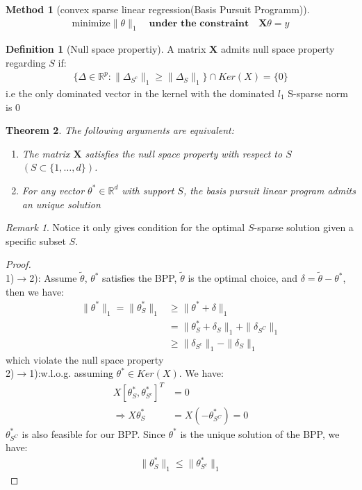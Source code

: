 \documentclass[a4paper,12pt, oneside, fleqn]{book}
\newtheorem{theorem}{Theorem}[section]
\newtheorem{method}[theorem]{Method}
\theoremstyle{definition}
\newtheorem{definition}{Definition}[section]
\theoremstyle{remark}
\newtheorem*{remark}{Remark}
\begin{document}
\begin{method}[convex sparse linear regression(Basis Pursuit Programm)]
\begin{align}\label{bpp}
	\text{minimize} \|\theta\|_1 \quad \textbf{under the constraint}\quad \mathbf{X} \theta = y
\end{align}
\end{method}


\begin{definition}[Null space propertiy]
	A matrix $\mathbf{X}$ admits null space property regarding $S$ if:
	\begin{align*}
		\{ \Delta \in \mathbb{R}^p: \|\Delta_{S^c}\|_1 \geq \|\Delta_S\|_1 \} \cap Ker(X) = \{0\}
	\end{align*}
	i.e the only dominated vector in the kernel with the dominated $l_1$ S-sparse norm is 0
\end{definition} 

\begin{theorem}
	The following arguments are equivalent:
	\begin{enumerate}
		\item The matrix $\mathbf{X}$ satisfies the null space property with respect to $S$ $(S \subset\{1, \dots, d\})$.
		\item For any vector $\theta^* \in \mathbb{R}^d$ with support $S$, the basis pursuit linear program admits an unique solution
	\end{enumerate}
\end{theorem}
\begin{remark}
Notice it only gives condition for the optimal $S$-sparse solution	 given a specific subset $S$. 
\end{remark}

\begin{proof}
\quad\\
1)$\rightarrow$2): Assume $\tilde{\theta}$, $\theta^*$ satisfies the BPP, $\tilde{\theta}$ is the optimal choice, and $\delta = \tilde{\theta} - \theta^*$, then we have:
\begin{align*}
	\|\theta^*\|_1 = \|\theta^*_S\|_1 &\geq  \|\theta^* + \delta\|_1\\
	&= \|\theta^*_S + \delta_S \|_1 + \|\delta_{S^C}\|_1\\
	&\geq \|\delta_{S^c}\|_1 - \|\delta_S\|_1
\end{align*}
which violate the null space property\\
2)$\rightarrow$1):w.l.o.g. assuming $\theta^* \in Ker(X)$. We have:
\begin{align*}
	X [\theta^*_S, \theta^*_{S^c}]^T &= 0\\
	\Rightarrow X \theta^*_S &= X(-\theta^*_{S^C}) = 0
\end{align*}  
$\theta^*_{S^C}$ is also feasible for our BPP. Since $\theta^*$ is the unique solution of the BPP, we have:
\begin{align*}
	\|\theta^*_S\|_1 \leq \|\theta^*_{S^c}\|_1
\end{align*}
\end{proof}
\end{document}

